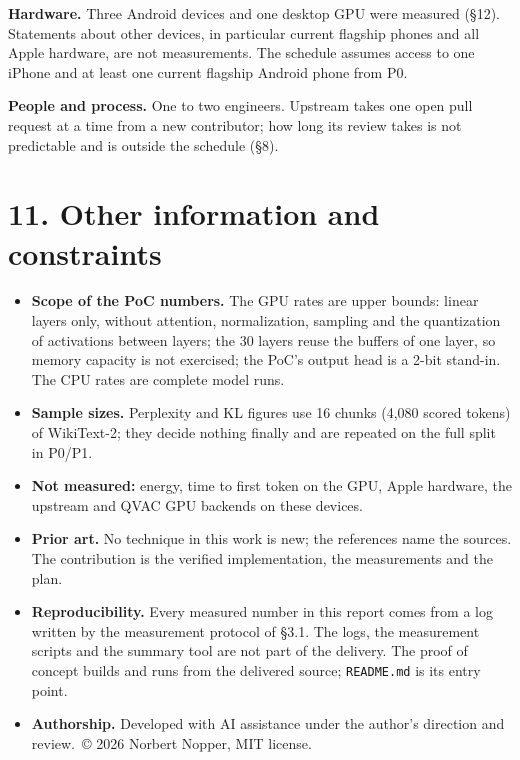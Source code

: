 \documentclass[
  10pt,
]{article}
\providecommand{\tightlist}{%
  \setlength{\itemsep}{0pt}\setlength{\parskip}{0pt}}
\begin{document}
\textbf{Hardware.} Three Android devices and one desktop GPU were
measured (\S{}12). Statements about other devices, in particular
current flagship phones and all Apple hardware, are not measurements.
The schedule assumes access to one iPhone and at least one current
flagship Android phone from P0.

\textbf{People and process.} One to two engineers. Upstream takes one
open pull request at a time from a new contributor; how long its review
takes is not predictable and is outside the schedule (\S{}8).

\section{11. Other information and
constraints}\label{other-information-and-constraints}

\begin{itemize}
\tightlist%
\item
  \textbf{Scope of the PoC numbers.} The GPU rates are upper bounds:
  linear layers only, without attention, normalization, sampling and the
  quantization of activations between layers; the 30 layers reuse the
  buffers of one layer, so memory capacity is not exercised; the PoC's
  output head is a 2-bit stand-in. The CPU rates are complete model
  runs.
\item
  \textbf{Sample sizes.} Perplexity and KL figures use 16 chunks (4,080
  scored tokens) of WikiText-2; they decide nothing finally and are
  repeated on the full split in P0/P1.
\item
  \textbf{Not measured:} energy, time to first token on the GPU, Apple
  hardware, the upstream and QVAC GPU backends on these devices.
\item
  \textbf{Prior art.} No technique in this work is new; the references
  name the sources. The contribution is the verified implementation, the
  measurements and the plan.
\item
  \textbf{Reproducibility.} Every measured number in this report comes
  from a log written by the measurement protocol of \S{}3.1. The logs,
  the measurement scripts and the summary tool are not part of the
  delivery. The proof of concept builds and runs from the delivered
  source; \texttt{README.md} is its entry point.
\item
  \textbf{Authorship.} Developed with AI assistance under the author's
  direction and review.\ \copyright{} 2026 Norbert Nopper, MIT license.
\end{itemize}
\end{document}
